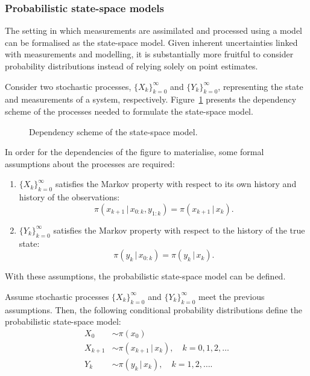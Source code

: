 \subsubsection{Probabilistic state-space models}
The setting in which measurements are assimilated and processed using a model can be formalised as the state-space model.
Given inherent uncertainties linked with measurements and modelling, it is substantially more fruitful to consider probability distributions instead of relying solely on point estimates.

Consider two stochastic processes, $\{X_k\}_{k=0}^{\infty}$ and $\{Y_k\}_{k=0}^{\infty}$, representing the state and measurements of a system, respectively.
Figure~\ref{fig:statespacedependency} presents the dependency scheme of the processes needed to formulate the state-space model.
\begin{figure}[H]
    
    \caption{\label{fig:statespacedependency}Dependency scheme of the state-space model.}
\end{figure}
In order for the dependencies of the figure to materialise, some formal assumptions about the processes are required:
\begin{enumerate}
    \item 
        $\{X_k\}_{k=0}^{\infty}$ satisfies the Markov property with respect to its own history and history of the observations:
        \begin{equation}\label{eq:markov1}
            \pi (x_{k+1} \, \vert \, x_{0:k}, y_{1:k}) = \pi (x_{k+1} \, \vert \, x_k).
        \end{equation}
    \item
        $\{Y_k\}_{k=0}^{\infty}$ satisfies the Markov property with respect to the history of the true state:
        \begin{equation}\label{eq:markov2}
            \pi (y_k \, \vert \, x_{0:k}) = \pi (y_k \, \vert \, x_k).
        \end{equation}
\end{enumerate}
With these assumptions, the probabilistic state-space model can be defined.
\begin{definition}\label{def:state-space}
    Assume stochastic processes $\{X_k\}_{k=0}^{\infty}$ and $\{Y_k\}_{k=0}^{\infty}$ meet the previous assumptions.
    Then, the following conditional probability distributions define the probabilistic state-space model:
    \begin{subequations}\label{eq:statespace}
        \begin{align}
            X_0 &\sim \pi (x_0)\\
            X_{k+1} &\sim \pi (x_{k+1} \, \vert \, x_{k}), \quad k = 0,1,2,\dots \label{eq:statespace1}\\
            Y_k &\sim \pi (y_k \, \vert \, x_k), \quad k = 1,2,\dots. \label{eq:statespace2}
        \end{align}
    \end{subequations}
\end{definition}
